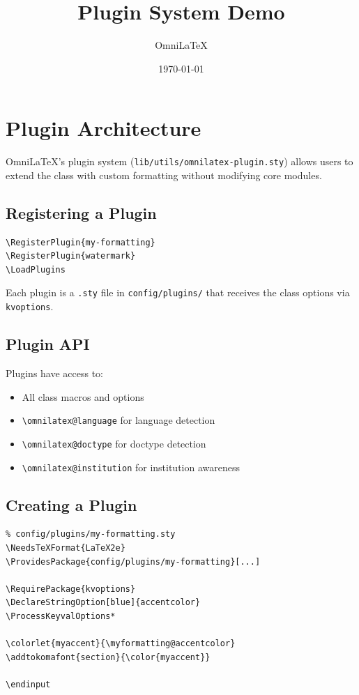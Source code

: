 \documentclass[
    language=english,
    doctype=article,
    institution=none,
]{../../omnilatex}
\title{Plugin System Demo}
\author{OmniLaTeX}
\date{\today}
\begin{document}
\maketitle

\section{Plugin Architecture}

OmniLaTeX's plugin system (\texttt{lib/utils/omnilatex-plugin.sty})
allows users to extend the class with custom formatting without
modifying core modules.

\subsection{Registering a Plugin}

\begin{verbatim}
\RegisterPlugin{my-formatting}
\RegisterPlugin{watermark}
\LoadPlugins
\end{verbatim}

Each plugin is a \texttt{.sty} file in \texttt{config/plugins/} that
receives the class options via \texttt{kvoptions}.

\subsection{Plugin API}

Plugins have access to:
\begin{itemize}
  \item All class macros and options
  \item \texttt{\textbackslash omnilatex@language} for language detection
  \item \texttt{\textbackslash omnilatex@doctype} for doctype detection
  \item \texttt{\textbackslash omnilatex@institution} for institution awareness
\end{itemize}

\subsection{Creating a Plugin}

\begin{verbatim}
% config/plugins/my-formatting.sty
\NeedsTeXFormat{LaTeX2e}
\ProvidesPackage{config/plugins/my-formatting}[...]

\RequirePackage{kvoptions}
\DeclareStringOption[blue]{accentcolor}
\ProcessKeyvalOptions*

\colorlet{myaccent}{\myformatting@accentcolor}
\addtokomafont{section}{\color{myaccent}}

\endinput
\end{verbatim}
\end{document}
